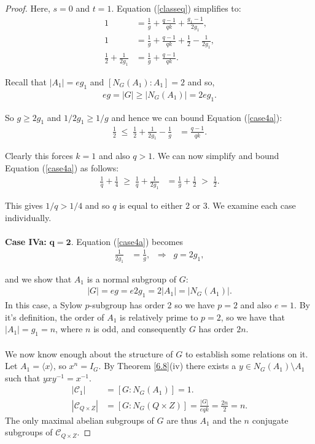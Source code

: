\begin{proof} Here, $s = 0$ and $t = 1$. Equation (\ref{classeq}) simplifies to:
\begin{align}\label{case4a} 1 &= \frac{1}{g} + \frac{q-1}{qk} +  \frac{g_1-1}{2g_1}, \nonumber
\\ 1 &= \frac{1}{g} + \frac{q-1}{qk} + \frac{1}{2} - \frac{1}{2g_1}, \nonumber
\\ \frac{1}{2} + \frac{1}{2g_1} &= \frac{1}{g} + \frac{q-1}{qk}.
\end{align}

Recall that $|A_1|=eg_1$ and $[N_G(A_1): A_1] = 2$ and so,
\begin{align*} eg = |G| \geq |N_G(A_1)| = 2eg_1.
\end{align*}

So $g \geq 2g_1$ and $1/2g_1 \geq 1/g$ and hence we can bound Equation (\ref{case4a}):
\begin{align*} \frac{1}{2} \; \leq \; \frac{1}{2} + \frac{1}{2g_1} - \frac{1}{g} &= \frac{q-1}{qk}.
\end{align*}

Clearly this forces $k = 1$ and also $q > 1$. We can now simplify and bound Equation (\ref{case4a}) as follows:
\begin{align*} \frac{1}{q} + \frac{1}{4} \; \geq \; \frac{1}{q} + \frac{1}{2g_1} &= \frac{1}{g} + \frac{1}{2} \; > \; \frac{1}{2}. 
\end{align*}

This gives $1/q > 1/4$ and so $q$ is equal to either 2 or 3. We examine each case individually. \\
\\
 \space \textbf{Case IVa:} $\pmb{q = 2}$. Equation (\ref{case4a}) becomes
\begin{align*} \frac{1}{2g_1} &= \frac{1}{g}, \; \; \Longrightarrow \; \; g = 2g_1,
\end{align*}

and we show that $A_1$ is a normal subgroup of $G$:
\begin{align*} |G| = eg = e2g_1 = 2|A_1| = |N_G(A_1)|. 
\end{align*}
In this case, a Sylow $p$-subgroup has order 2 so we have $p=2$ and also $e=1$. By it's definition, the order of $A_1$ is relatively prime to $p=2$, so we have that $|A_1|= g_1 = n$, where $n$ is odd, and consequently $G$ has order $2n$. \\  
\\
We now know enough about the structure of $G$ to establish some relations on it. Let $A_1 = \langle x \rangle$, so $x^n = I_G$. By Theorem \ref{6.8}(iv) there exists a $y \in N_G(A_1) \! \setminus \! A_1$ such that $y x y^{-1} = x^{-1}$.
\begin{align*} |\mathcal{C}_1| &= [G : N_G(A_1)] = 1.
\\ |\mathcal{C}_{Q \times Z}| &= [G : N_G(Q \times Z)] = \frac{|G|}{eqk} = \frac{2n}{2} = n.
\end{align*}
The only maximal abelian subgroups of $G$ are thus $A_1$ and the $n$ conjugate subgroups of $\mathcal{C}_{Q \times Z}$.


\end{proof}
